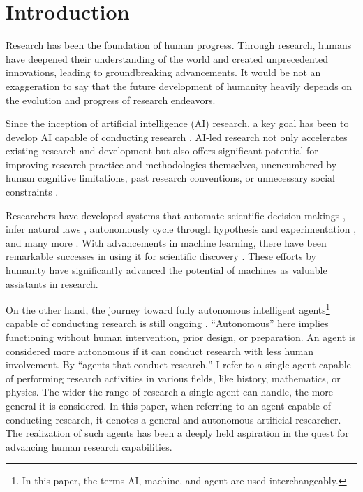\section{Introduction}
Research has been the foundation of human progress. Through research, humans have deepened their understanding of the world and created unprecedented innovations, leading to groundbreaking advancements. It would be not an exaggeration to say that the future development of humanity heavily depends on the evolution and progress of research endeavors.

Since the inception of artificial intelligence (AI) research, a key goal has been to develop AI capable of conducting research \cite{zenil2023future}. AI-led research not only accelerates existing research and development but also offers significant potential for improving research practice and methodologies themselves, unencumbered by human cognitive limitations, past research conventions, or unnecessary social constraints \cite{zenil2023future,kitano2021nobel}.

Researchers have developed systems that automate scientific decision makings \cite{lindsay1993dendral}, infer natural laws \cite{langley1987scientific}, autonomously cycle through hypothesis and experimentation \cite{king2004functional}, and many more \cite{zenil2023future,zenil2023}. With advancements in machine learning, there have been remarkable successes in using it for scientific discovery \cite{wang2023scientific,xu2021artificial,zhang2023artificial,ai4science2023impact}. These efforts by humanity have significantly advanced the potential of machines as valuable assistants in research.

On the other hand, the journey toward fully autonomous intelligent agents\footnote{
In this paper, the terms AI, machine, and agent are used interchangeably.
} capable of conducting research is still ongoing \cite{zenil2023future,coley2020autonomousII}. ``Autonomous'' here implies functioning without human intervention, prior design, or preparation. An agent is considered more autonomous if it can conduct research with less human involvement. By ``agents that conduct research,'' I refer to a single agent capable of performing research activities in various fields, like history, mathematics, or physics. The wider the range of research a single agent can handle, the more general it is considered. In this paper, when referring to an agent capable of conducting research, it denotes a general and autonomous artificial researcher. The realization of such agents has been a deeply held aspiration in the quest for advancing human research capabilities.

